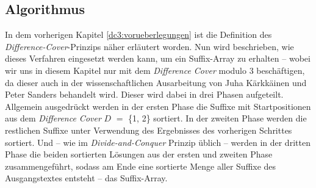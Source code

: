 \subsection{Algorithmus}
\label{dc3:algorithmus}

In dem vorherigen Kapitel \ref{dc3:vorueberlegungen} ist die Definition des \emph{Difference-Cover}-Prinzips näher erläutert worden. Nun wird beschrieben, wie dieses Verfahren eingesetzt werden kann, um ein Suffix-Array zu erhalten -- wobei wir uns in diesem Kapitel nur mit dem \emph{Difference Cover} modulo $3$ beschäftigen, da dieser auch in der wissenschaftlichen Ausarbeitung von Juha Kärkkäinen und Peter Sanders behandelt wird. Dieser wird dabei in drei Phasen aufgeteilt. Allgemein ausgedrückt werden in der ersten Phase die Suffixe mit Startpositionen aus dem \emph{Difference Cover} \(D\) $=$ \{1, 2\} sortiert. In der zweiten Phase werden die restlichen Suffixe unter Verwendung des Ergebnisses des vorherigen Schrittes sortiert. Und -- wie im \emph{Divide-and-Conquer} Prinzip üblich -- werden in der dritten Phase die beiden sortierten Lösungen aus der ersten und zweiten Phase zusammengeführt, sodass am Ende eine sortierte Menge aller Suffixe des Ausgangstextes entsteht -- das Suffix-Array.





